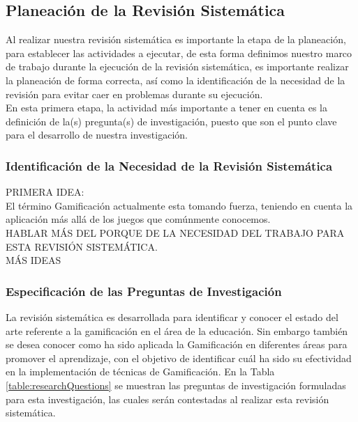 \documentclass[•]{article}
\begin{document}

	\subsection{Planeación de la Revisión Sistemática}
	Al realizar nuestra revisión sistemática es importante la etapa de la planeación, para establecer las actividades a ejecutar, de esta forma definimos nuestro marco de trabajo durante la ejecución de la revisión sistemática, es importante realizar la planeación de forma correcta, así como la identificación de la necesidad de la revisión para evitar caer en problemas durante su ejecución.\\
	En esta primera etapa, la actividad más importante a tener en cuenta es la definición de la(s) pregunta(s) de investigación, puesto que son el punto clave para el desarrollo de nuestra investigación.
	

	\subsubsection{Identificación de la Necesidad de la Revisión Sistemática}
PRIMERA IDEA:\\	
	El término Gamificación actualmente esta tomando fuerza, teniendo en cuenta la aplicación más allá de los juegos que comúnmente conocemos. 
	\\HABLAR MÁS DEL PORQUE DE LA NECESIDAD DEL TRABAJO PARA ESTA REVISIÓN SISTEMÁTICA.
	\\
	MÁS IDEAS\\


	\subsubsection{Especificación de las Preguntas de Investigación}
    La revisión sistemática es desarrollada para identificar y conocer el estado del arte referente a la gamificación en el área de la educación. Sin embargo también se desea conocer como ha sido aplicada la Gamificación en diferentes áreas para promover el aprendizaje, con el objetivo de identificar cuál ha sido su efectividad en la implementación de técnicas de Gamificación. En la Tabla \ref{table:researchQuestions} se muestran las preguntas de investigación formuladas para esta investigación, las cuales serán contestadas al realizar esta revisión sistemática.\\
\end{document}
